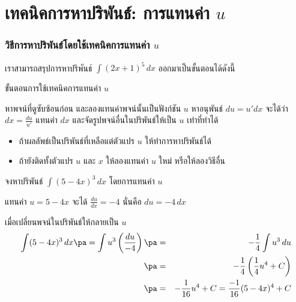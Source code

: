 \section[เทคนิคแทนค่า $u$]{เทคนิคการหาปริพันธ์: การแทนค่า $u$}
\frame{\sectionpage}

\begin{frame}
\frametitle{วิธีการหาปริพันธ์โดยใช้เทคนิคการแทนค่า $u$}
เราสามารถสรุปการหาปริพันธ์ $\int (2x+1 )^5\,dx$  ออกมาเป็นขั้นตอนได้ดังนี้
\begin{remark}{ขั้นตอนการใช้เทคนิคการแทนค่า $u$}
\begin{tasks}[style = enumerate]
\task หาพจน์ที่ดูซับซ้อนก่อน และลองแทนค่าพจน์นั้นเป็นฟังก์ชัน $u$ \pa
\task หาอนุพันธ์ $du = u' dx$ จะได้ว่า $dx = \frac{du}{u'}$ \pa
\task แทนค่า $dx$ และจัดรูปพจน์อื่นในปริพันธ์ให้เป็น $u$ เท่าที่ทำได้ 
\begin{itemize}
\item ถ้าผลลัพธ์เป็นปริพันธ์ที่เหลือแต่ตัวแปร $u$ ให้ทำการหาปริพันธ์ได้ 
\item ถ้ายังติดทั้งตัวแปร $u$ และ $x$ ให้ลองแทนค่า $u$ ใหม่ หรือให้ลองวิธีอื่น
\end{itemize}
\end{tasks}
\end{remark}
\end{frame}

\begin{frame}[t]
\begin{ex}
จงหาปริพันธ์ $\int (5-4x)^3\,dx$ โดยการแทนค่า $u$
\end{ex}
\begin{sol}
แทนค่า $u = 5-4x$ \pa จะได้ $\frac{du}{dx} = -4$ \pa นั่นคือ $du = -4\, dx$ \pa

เมื่อเปลี่ยนพจน์ในปริพันธ์ให้กลายเป็น $u$ \pa
\begin{eqnarray*}
\int (5-4x)^3 \, dx \pa = \int u^3 \left( \frac{du}{-4} \right) \pa &=& -\frac{1}{4} \int u^3 \, du \\
\pa &=& -\frac{1}{4} \left( \frac{1}{4} u^4 + C \right) \\
\pa &=& -\frac{1}{16}u^4 + C = \frac{-1}{16}(5-4x)^4 + C
\end{eqnarray*}
\end{sol}
\end{frame}

